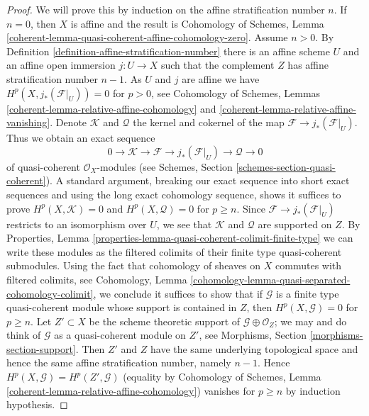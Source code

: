 \documentclass[10pt,a4paper]{amsart}
\theoremstyle{plain}
\theoremstyle{definition}
\theoremstyle{remark}
\numberwithin{equation}{subsection}
\begin{document}
\begin{proof}
We will prove this by induction on the affine stratification number $n$.
If $n = 0$, then $X$ is affine and the result is
Cohomology of Schemes, Lemma
\ref{coherent-lemma-quasi-coherent-affine-cohomology-zero}.
Assume $n > 0$. By Definition \ref{definition-affine-stratification-number}
there is an affine scheme $U$ and an affine open immersion $j : U \to X$
such that the complement $Z$ has affine stratification number $n - 1$.
As $U$ and $j$ are affine we have $H^p(X, j_*(\mathcal{F}|_U)) = 0$
for $p > 0$, see Cohomology of Schemes, Lemmas
\ref{coherent-lemma-relative-affine-cohomology} and
\ref{coherent-lemma-relative-affine-vanishing}.
Denote $\mathcal{K}$ and $\mathcal{Q}$ the kernel and cokernel
of the map $\mathcal{F} \to j_*(\mathcal{F}|_U)$. Thus we obtain
an exact sequence
$$
0 \to \mathcal{K} \to \mathcal{F} \to j_*(\mathcal{F}|_U)
\to \mathcal{Q} \to 0
$$
of quasi-coherent $\mathcal{O}_X$-modules (see
Schemes, Section \ref{schemes-section-quasi-coherent}).
A standard argument, breaking our exact sequence into short
exact sequences and using the long exact cohomology sequence,
shows it suffices to prove $H^p(X, \mathcal{K}) = 0$
and $H^p(X, \mathcal{Q}) = 0$ for $p \geq n$.
Since $\mathcal{F} \to j_*(\mathcal{F}|_U)$ restricts
to an isomorphism over $U$, we see that $\mathcal{K}$
and $\mathcal{Q}$ are supported on $Z$.
By Properties, Lemma
\ref{properties-lemma-quasi-coherent-colimit-finite-type}
we can write these modules as the filtered colimits of
their finite type quasi-coherent submodules.
Using the fact that cohomology of sheaves on $X$ commutes
with filtered colimits, see
Cohomology, Lemma \ref{cohomology-lemma-quasi-separated-cohomology-colimit},
we conclude it suffices to show that if $\mathcal{G}$
is a finite type quasi-coherent module whose support
is contained in $Z$, then $H^p(X, \mathcal{G}) = 0$ for $p \geq n$.
Let $Z' \subset X$ be the scheme theoretic support of
$\mathcal{G} \oplus \mathcal{O}_Z$; we may and do think
of $\mathcal{G}$ as a quasi-coherent module on $Z'$, see
Morphisms, Section \ref{morphisms-section-support}.
Then $Z'$ and $Z$ have the same underlying topological space
and hence the same affine stratification number, namely $n - 1$.
Hence $H^p(X, \mathcal{G}) = H^p(Z', \mathcal{G})$
(equality by Cohomology of Schemes, Lemma
\ref{coherent-lemma-relative-affine-cohomology})
vanishes for $p \geq n$ by induction hypothesis.
\end{proof}
\end{document}
